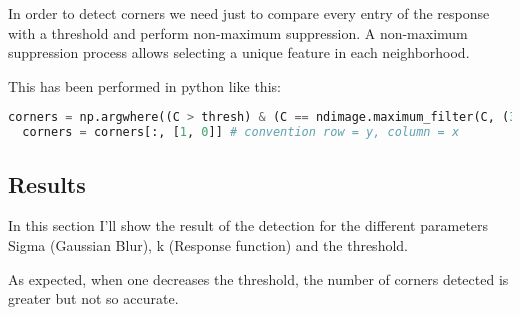 \documentclass{ETHExercise}
\begin{document}
In order to detect corners we need just to compare every entry of
the response with a threshold and perform non-maximum suppression.
A non-maximum suppression process allows selecting a unique feature in each neighborhood.

This has been performed in python like this:

\begin{lstlisting}[language=Python, caption=Local auto-correlation matrix elements]
  corners = np.argwhere((C > thresh) & (C == ndimage.maximum_filter(C, (3,3))))
  corners = corners[:, [1, 0]] # convention row = y, column = x
\end{lstlisting}


\subsection{Results}
In this section I'll show the result of the detection for the different parameters Sigma (Gaussian Blur),
k (Response function) and the threshold.

As expected, when one decreases the threshold, the number of corners detected is greater but not so accurate.
\end{document}
